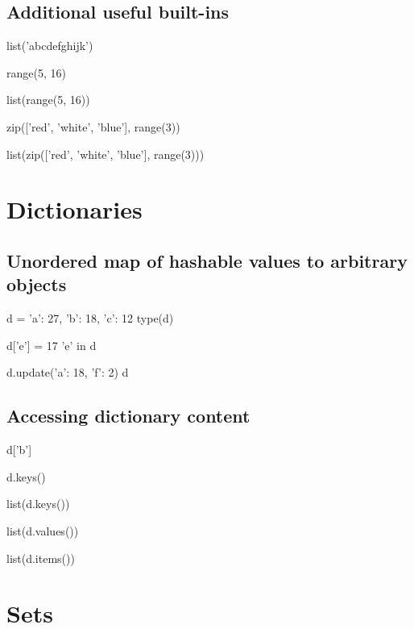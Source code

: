 \documentclass[aspectratio=1610,slidestop]{beamer}
\begin{document}
\subsection{Additional useful built-ins}
\begin{pframe}
\vspace{-0.25cm}
\begin{pyconsole}
list('abcdefghijk')

range(5, 16)

list(range(5, 16))

zip(['red', 'white', 'blue'], range(3))

list(zip(['red', 'white', 'blue'], range(3)))
\end{pyconsole}
\end{pframe}


\section{Dictionaries}
\subsection{Unordered map of hashable values to arbitrary objects}
\begin{pframe}
\begin{pyconsole}
d = {'a': 27, 'b': 18, 'c': 12}
type(d)

d['e'] = 17
'e' in d

d.update({'a': 18, 'f': 2})
d
\end{pyconsole}
\end{pframe}


\subsection{Accessing dictionary content}
\begin{pframe}
\vspace{-0.25cm}
\begin{pyconsole}
d['b']

d.keys()

list(d.keys())

list(d.values())

list(d.items())
\end{pyconsole}
\end{pframe}


\section{Sets}
\end{document}
